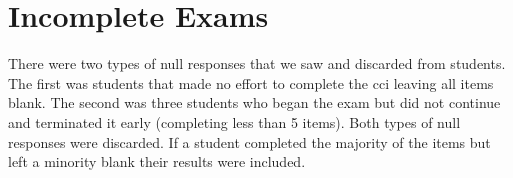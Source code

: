 \ifshort
\begin{table}[!htbp]
\centering
\caption{Breakdown of Students By University}
\label{tab:student_breakdown}
\end{table}
\fi


\iflong
\section{Incomplete Exams}

There were two types of null responses that we saw and discarded from students. The first was students that made no effort to complete the \gls{cci} leaving all items blank. The second was three students who began the exam but did not continue and terminated it early (completing less than 5 items). Both types of null responses were discarded. If a student completed the majority of the items but left a minority blank their results were included.

\fi
